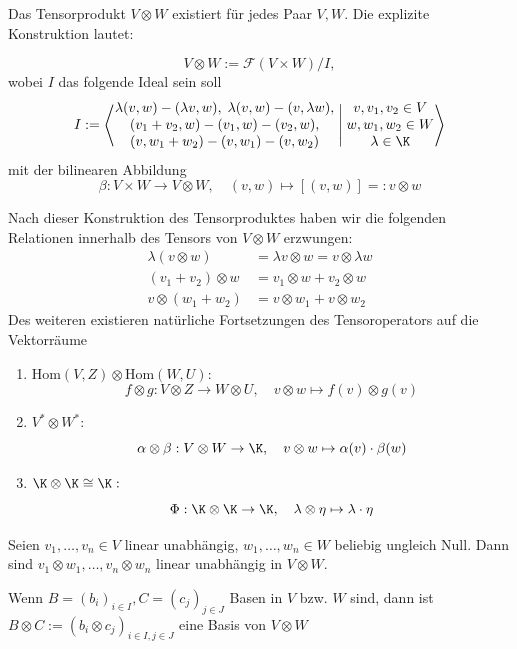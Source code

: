 \documentclass[11pt, a4paper]{article}
\begin{document}
\begin{lemma}
    Das Tensorprodukt $V\otimes W$ existiert für jedes Paar $V,W$. Die explizite Konstruktion lautet:

    $$V\otimes W:= \mathcal F(V\times W) / I,$$
    wobei $I$ das folgende Ideal sein soll
    $$I:= \left\langle \begin{matrix}
        \lambda (v,w) - (\lambda v, w),\;  \lambda(v,w) - (v,\lambda w), \\
        (v_1 +v_2 , w) -(v_1,w) -(v_2,w),\\ (v, w_1+w_2) -(v,w_1) -(v,w_2)
    \end{matrix} \; \Bigg|\; \begin{matrix}
        v,v_1,v_2\in V \\ w,w_1,w_2 \in W \\ \lambda \in \K 
    \end{matrix} \right\rangle $$
    mit der bilinearen Abbildung $$\beta: V\times W \to V\otimes W,\quad  (v,w)\mapsto [(v,w)]=: v\otimes w$$
\end{lemma}

\begin{note}
    Nach dieser Konstruktion des Tensorproduktes haben wir die folgenden Relationen innerhalb des Tensors von $V\otimes W$ erzwungen:
    \begin{align*}
    \lambda (v\otimes w)&= \lambda v\otimes w = v\otimes \lambda w \\
    (v_1+v_2)\otimes w &= v_1 \otimes w + v_2 \otimes w \\
    v \otimes (w_1+w_2) &= v\otimes w_1 + v\otimes w_2
    \end{align*} 
    Des weiteren existieren natürliche Fortsetzungen des Tensoroperators auf die Vektorräume 
    \begin{enumerate}
        \item $\mathrm{Hom}(V,Z)\otimes \mathrm{Hom}(W,U):$
        $$f\otimes g: V\otimes Z \to W\otimes U, \quad v\otimes w \mapsto f(v) \otimes g(v)$$
        \item $V^*\otimes W^*:$
        $$\alpha \otimes \beta: V\otimes W \to \K, \quad v\otimes w \mapsto \alpha(v)\cdot \beta(w)$$
        \item $\K \otimes \K \cong \K:$
        $$\Phi:\K \otimes \K \to \K,\quad \lambda \otimes \eta \mapsto \lambda \cdot \eta$$
    \end{enumerate}
\end{note}

\begin{lemma} Seien $v_1,\dots , v_n \in V$ linear unabhängig, $w_1,\dots , w_n\in W$ beliebig ungleich Null. Dann sind $v_1\otimes w_1, \dots , v_n \otimes w_n$ linear unabhängig in $V\otimes W$.
\end{lemma}
\begin{corollary}[Tensorproduktbasis] Wenn $B= (b_i)_{i\in I}, C=(c_j)_{j\in J}$ Basen in $V$ bzw. $W$ sind, dann ist $B\otimes C:= (b_i \otimes c_j)_{i\in I, j \in J}$ eine Basis von $V\otimes W$
\end{corollary}
\end{document}
